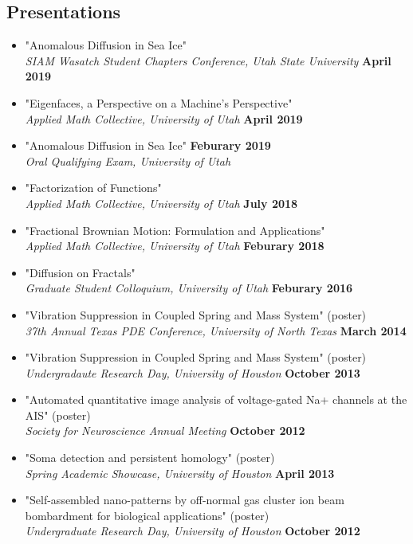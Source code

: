 \documentclass[margin,line]{res}
\begin{document}
\begin{resume}
\section{\sc Presentations}
\begin{itemize}
    \item[] "Anomalous Diffusion in Sea Ice"
        \\{\it SIAM Wasatch Student Chapters Conference, Utah State University} \hfill {\bf April 2019} 
    \item[] "Eigenfaces, a Perspective on a Machine's Perspective"
        \\{\it Applied Math Collective, University of Utah} \hfill {\bf April 2019}
    \item[] "Anomalous Diffusion in Sea Ice" \hfill {\bf Feburary 2019} 
        \\ {\it Oral Qualifying Exam, University of Utah }
    \item[] "Factorization of Functions" 
        \\ {\it Applied Math Collective, University of Utah } \hfill {\bf July 2018} 
    \item[] "Fractional Brownian Motion: Formulation and Applications"
        \\ {\it Applied Math Collective, University of Utah} \hfill {\bf Feburary 2018} 
    \item[] "Diffusion on Fractals"
        \\ {\it Graduate Student Colloquium, University of Utah} \hfill {\bf Feburary 2016} 
    \item[] "Vibration Suppression in Coupled Spring and Mass System" (poster)
        \\ {\it 37th Annual Texas PDE Conference, University of North Texas} \hfill {\bf March 2014} 
    \item[] "Vibration Suppression in Coupled Spring and Mass System" (poster)
        \\ {\it Undergradaute Research Day, University of Houston} \hfill {\bf October 2013} 
    \item[] "Automated quantitative image analysis of voltage-gated Na+ channels at the AIS" (poster) 
    \\ {\it Society for Neuroscience Annual Meeting} \hfill {\bf October 2012} 
    \item[] "Soma detection and persistent homology" (poster) 
    \\ {\it Spring Academic Showcase, University of Houston} \hfill {\bf April 2013} 
    \item[] "Self-assembled nano-patterns by off-normal gas cluster ion beam bombardment for biological applications" (poster) 
    \\ {\it Undergraduate Research Day, University of Houston} \hfill {\bf October 2012} 
\end{itemize}


\end{resume}
\end{document}
